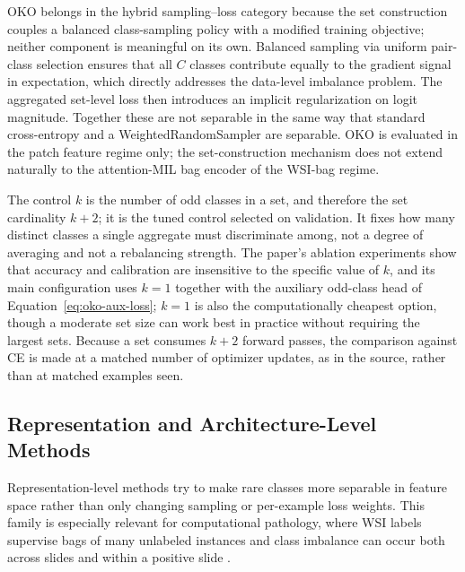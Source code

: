 \documentclass[11pt]{article}
\begin{document}
OKO belongs in the hybrid sampling--loss category because the set construction couples a balanced class-sampling policy with a modified training objective; neither component is meaningful on its own. Balanced sampling via uniform pair-class selection ensures that all $C$ classes contribute equally to the gradient signal in expectation, which directly addresses the data-level imbalance problem. The aggregated set-level loss then introduces an implicit regularization on logit magnitude. Together these are not separable in the same way that standard cross-entropy and a WeightedRandomSampler are separable. OKO is evaluated in the patch feature regime only; the set-construction mechanism does not extend naturally to the attention-MIL bag encoder of the WSI-bag regime.

The control $k$ is the number of odd classes in a set, and therefore the set cardinality $k+2$; it is the tuned control selected on validation. It fixes how many distinct classes a single aggregate must discriminate among, not a degree of averaging and not a rebalancing strength. The paper's ablation experiments show that accuracy and calibration are insensitive to the specific value of $k$, and its main configuration uses $k=1$ together with the auxiliary odd-class head of Equation~\eqref{eq:oko-aux-loss}; $k=1$ is also the computationally cheapest option, though a moderate set size can work best in practice without requiring the largest sets. Because a set consumes $k+2$ forward passes, the comparison against CE is made at a matched number of optimizer updates, as in the source, rather than at matched examples seen.

\subsection{Representation and Architecture-Level Methods}
Representation-level methods try to make rare classes more separable in feature space rather than only changing sampling or per-example loss weights. This family is especially relevant for computational pathology, where WSI labels supervise bags of many unlabeled instances and class imbalance can occur both across slides and within a positive slide \citep{juyal2024scMil}.
\end{document}
